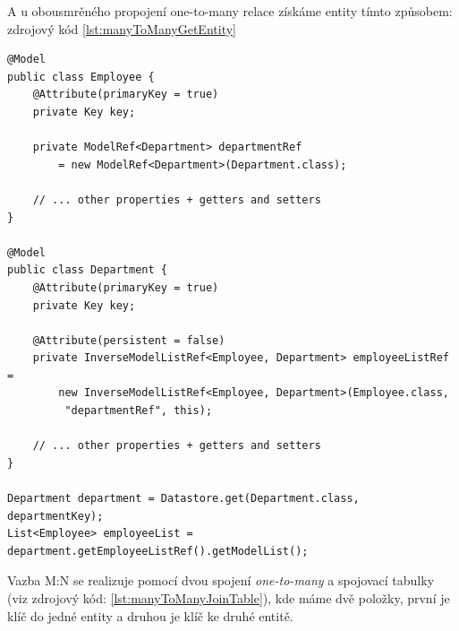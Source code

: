 A u obousmrěného propojení one-to-many relace získáme entity tímto způsobem: zdrojový kód \ref{lst:manyToManyGetEntity}

\begin{lstlisting}[caption={Získání entit ze vztahu many-to-many},label=lst:manyToManyGetEntity,belowcaptionskip=0.4cm]
@Model
public class Employee {
	@Attribute(primaryKey = true)
	private Key key;	
	
	private ModelRef<Department> departmentRef 
		= new ModelRef<Department>(Department.class);
	
	// ... other properties + getters and setters
}

@Model
public class Department {
	@Attribute(primaryKey = true)
	private Key key;
	
	@Attribute(persistent = false)
	private InverseModelListRef<Employee, Department> employeeListRef =
		new InverseModelListRef<Employee, Department>(Employee.class,
		 "departmentRef", this);

	// ... other properties + getters and setters
}

Department department = Datastore.get(Department.class, departmentKey);
List<Employee> employeeList = department.getEmployeeListRef().getModelList();
\end{lstlisting}

Vazba M:N se realizuje pomocí dvou spojení \emph{one-to-many} a spojovací tabulky (viz zdrojový kód: \ref{lst:manyToManyJoinTable}), kde máme dvě položky, první je klíč do jedné entity a druhou je klíč ke druhé entitě. 


